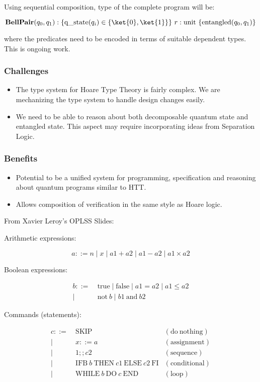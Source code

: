 \documentclass[acmsmall,review]{acmart}\settopmatter{printfolios=true,printccs=false,printacmref=false}
\begin{document}
Using sequential composition, type of the complete program will be:

\[ \mathbf{BellPair}(q_0, q_1) : \{ \mathrm{q\_state}(q_i) \in \{\ket{0}, \ket{1} \}\}\ r : \mathrm{unit}\ \{ \mathrm{entangled}(q_0, q_1) \} \]

where the predicates need to be encoded in terms of suitable dependent types. This is ongoing work.

\subsubsection{Challenges}
\begin{itemize}
	\item The type system for Hoare Type Theory is fairly complex. We are mechanizing the type system to handle design changes easily.
	\item We need to be able to reason about both decomposable quantum state and entangled state. This aspect may require incorporating ideas from Separation Logic.
\end{itemize}

\subsubsection{Benefits}
\begin{itemize}
	\item Potential to be a unified system for programming, specification and reasoning about quantum programs similar to HTT.
	\item Allows composition of verification in the same style as Hoare logic.
\end{itemize}


\hrulefill

From Xavier Leroy's OPLSS Slides:


Arithmetic expressions:

\[a ::= n \mid x \mid a1 + a2 \mid a1 - a2 \mid a1 \times a2\]

Boolean expressions:

\begin{align*}
	b ::=&\ \mathrm{true} \mid \mathrm{false} \mid a1 = a2 \mid a1 \le a2\\
	\mid&\ \mathrm{not}\ b \mid b1\ \mathrm{and}\ b2
\end{align*}

Commands (statements):

\begin{align*}
	c ::=&\ \mathrm{SKIP}	&\mathrm{(do\ nothing)}\\
	\mid&\ x ::= a	&\mathrm{(assignment)}\\
	\mid&\ 1; ; c2	&\mathrm{(sequence)}\\
	\mid&\ \mathrm{IFB}\ b\ \mathrm{THEN}\ c1\ \mathrm{ELSE}\ c2\ \mathrm{FI}	&\mathrm{(conditional)}\\
	\mid&\ \mathrm{WHILE}\ b\ \mathrm{DO}\ c\ \mathrm{END}	&\mathrm{(loop)}
\end{align*}
\end{document}
